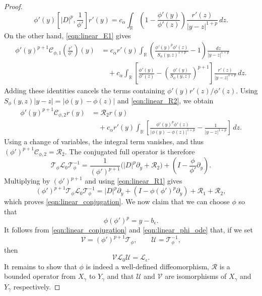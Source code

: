 \documentclass[11pt]{amsart}
\theoremstyle{definition}
\theoremstyle{remark}
\numberwithin{equation}{section}
\newcommand{\R}{\mathbb{R}}
\newcommand{\mc}[1]{\mathcal{#1}}
\begin{document}
\begin{proof}
    \[
        \phi'(y)\left[|D|^p,\frac{1}{\phi'}\right]r'(y)
        =c_\alpha\int_{\R}\left(1-\frac{\phi'(y)}{\phi'(z)}\right)
        \frac{r'(z)}{|y-z|^{1+p}}\,dz.
    \]
    On the other hand, \eqref{eqn:linear_E1} gives
    \begin{align*}
        \phi'(y)^{p+1}\mc{C}_{\phi,1}\left(\frac{r'}{\phi'}\right)(y)
        &=c_{\alpha}r'(y)\int_{\R}
        \left(\frac{\phi'(y)^p\phi'(z)}{S_\phi(y,z)^{1+p}}-1\right)
        \frac{dz}{|y-z|^{1+p}}\\
        &\quad+c_\alpha\int_{\R}
        \left[\frac{\phi'(y)}{\phi'(z)}
        -\left(\frac{\phi'(y)}{S_\phi(y,z)}\right)^{p+1}\right]
        \frac{r'(z)}{|y-z|^{1+p}}\,dz.
    \end{align*}
    Adding these identities cancels the terms containing
    $\phi'(y)r'(z)/\phi'(z)$. Using
    $S_\phi(y,z)|y-z|=|\phi(y)-\phi(z)|$ and \eqref{eqn:linear_R2}, we obtain
    \begin{align*}
        \phi'(y)^{p+1}\mc{C}_{\phi,2}r(y)
        & =\mc{R}_2r(y)\\
        &\quad+c_{\alpha}r'(y)\int_{\R}\left[
        \frac{\phi'(y)^p\phi'(z)}{|\phi(y)-\phi(z)|^{1+p}}
        -\frac{1}{|y-z|^{1+p}}\right]\,dz.
    \end{align*}
    Using a change of variables, the integral term vanishes, and thus $(\phi')^{p+1}\mc{C}_{\phi,2}=\mc{R}_2$.
    The conjugated full operator is therefore
    \[
        \mc{T}_\phi\mc{L}_0\mc{T}_\phi^{-1}
        =\frac{1}{(\phi')^{p+1}}\bigl(|D|^p\partial_y+\mc{R}_2\bigr)
        +
        \left(I-\frac{\phi}{\phi'}\partial_y\right).
    \]
    Multiplying by $(\phi')^{p+1}$ and using \eqref{eqn:linear_R1} gives
    \[
        (\phi')^{p+1}\mc{T}_\phi\mc{L}_0\mc{T}_\phi^{-1}
        =|D|^p\partial_y
        +
        \left(I-\phi(\phi')^p\partial_y\right)
        +\mc{R}_1+\mc{R}_2,
    \]
    which proves \eqref{eqn:linear_conjugation}. We now claim that we can choose $\phi$ so that
    \begin{equation}\label{eqn:linear_phi_ode}
        \phi (\phi')^p = y - b_\epsilon.
    \end{equation}
    It follows from \eqref{eqn:linear_conjugation} and \eqref{eqn:linear_phi_ode} that, if we set
    \begin{equation}\label{eqn:linear_conjugating_maps}
        \mc{V} = (\phi')^{p+1}\mc{T}_\phi, \qquad \mc{U} = \mc{T}_\phi^{-1},
    \end{equation}
    then
    \[\mc{V}\mc{L}_0\mc{U} = \mc{L}_\epsilon.\]
    It remains to show that $\phi$ is indeed a well-defined diffeomorphism, $\mc{R}$ is a bounded operator from $X_\gamma$ to $Y_\gamma$ and that $\mc{U}$ and $\mc{V}$ are isomorphisms of $X_\gamma$ and $Y_\gamma$ respectively. \par

\end{proof}
\end{document}
